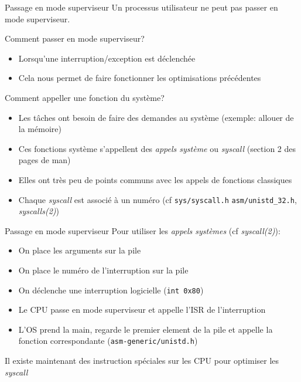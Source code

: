 \begin{frame}{Passage en mode superviseur}
  Un processus utilisateur ne peut pas passer en mode superviseur.

  Comment passer en mode superviseur?
  \begin{itemize} 
  \item Lorsqu'une interruption/exception est déclenchée
  \item Cela nous permet de faire fonctionner les optimisations précédentes
  \end{itemize} 

  Comment appeller une fonction du système?
  \begin{itemize} 
  \item  Les  tâches ont  besoin  de  faire  des demandes  au  système
    (exemple: allouer de la mémoire)
  \item Ces fonctions système s'appellent des \emph{appels système} ou
    \emph{syscall} (section 2 des pages de man)
  \item  Elles ont  très  peu de  points  communs avec  les appels  de
    fonctions classiques
  \item   Chaque  \emph{syscall}   est   associé  à   un  numéro   (cf
    \texttt{sys/syscall.h}                   \texttt{asm/unistd\_32.h},
    \emph{syscalls(2)})
  \end{itemize}

\end{frame}

\begin{frame}{Passage en mode superviseur}
  Pour utiliser les \emph{appels systèmes} (cf \emph{syscall(2)}):
  \begin{itemize}
  \item On place les arguments sur la pile
  \item On place le numéro de l'interruption sur la pile
  \item On déclenche une interruption logicielle (\texttt{int 0x80})
  \item  Le  CPU  passe  en  mode  superviseur  et  appelle  l'ISR  de
    l'interruption
  \item L'OS prend  la main, regarde le premier element  de la pile et
    appelle la fonction correspondante (\texttt{asm-generic/unistd.h})
  \end{itemize}
  Il  existe maintenant  des instruction  spéciales sur  les  CPU pour
  optimiser les \emph{syscall}
\end{frame}

